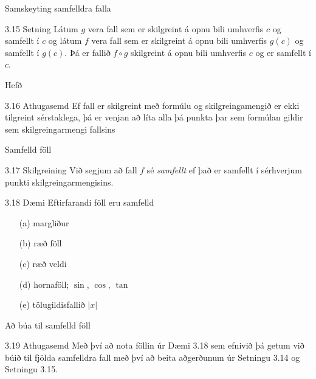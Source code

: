 \documentclass[icelandic,a4paper,12pt]{article}
\begin{document}
\begin{frame}{Samskeyting samfelldra falla}
 \begin{block}{3.15 Setning}
 Látum $g$ vera fall sem er skilgreint á opnu bili umhverfis $c$ og
samfellt í $c$ og látum $f$ vera fall sem er skilgreint á opnu bili
umhverfis $g(c)$ og samfellt í $g(c)$.  Þá er fallið $f\circ g$
skilgreint á opnu bili umhverfis $c$ og er samfellt í $c$.  
% 
 \end{block}
\end{frame}

\begin{frame}{Hefð}
 \begin{block}{3.16 Athugasemd}
  Ef fall er skilgreint með formúlu og skilgreingamengið er ekki
tilgreint sérstaklega, þá er venjan að líta alla þá punkta þar
sem formúlan gildir sem skilgreingarmengi fallsins
 \end{block}
\end{frame}

\begin{frame}{Samfelld föll}
 \begin{block}{3.17 Skilgreining}
 Við segjum að fall $f$ sé \emph{samfellt} ef það er samfellt í sérhverjum
punkti skilgreingarmengisins.
\end{block}

\pause

\begin{block}{3.18 Dæmi}
Eftirfarandi föll eru samfelld
\begin{itemize}
\pause
  \item[(a)] margliður
\pause
  \item[(b)] ræð föll
\pause
  \item[(c)] ræð veldi
\pause
  \item[(d)] hornaföll; $\sin$, $\cos$, $\tan$
\pause
  \item[(e)] tölugildisfallið $|x|$
\end{itemize}
\end{block}

\end{frame}

\begin{frame}{Að búa til samfelld föll}
 \begin{block}{3.19 Athugasemd}
 Með því að nota föllin úr Dæmi 3.18 sem efnivið þá getum við búið til 
fjölda samfelldra fall með því að beita aðgerðunum úr Setningu 3.14 og 
Setningu 3.15.
 \end{block}
\end{frame}
\end{document}

